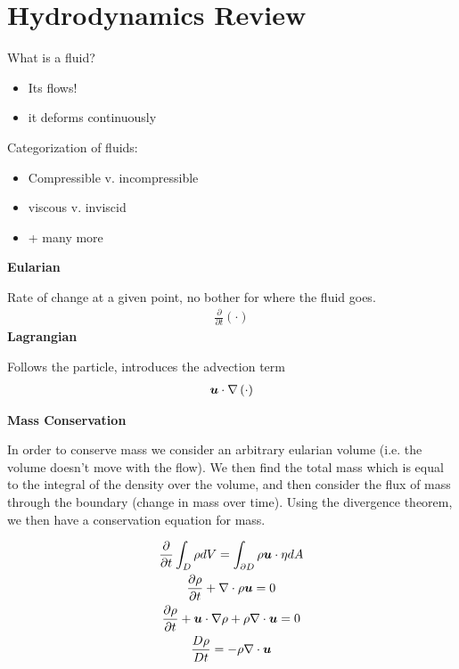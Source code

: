 \documentclass{article}
\begin{document}
\setlength{\parindent}{0pt}
\setcounter{section}{1}

\section{Hydrodynamics Review}

What is a fluid?
\begin{itemize}
    \item Its flows! 
    \item it deforms continuously
\end{itemize}

Categorization of fluids:
\begin{itemize}
    \item Compressible v. incompressible
    \item viscous v. inviscid
    \item + many more
\end{itemize}

\vspace{20pt}

    \centering
    {\Large \textbf{Eularian}}
    \vspace{5pt}

    Rate of change at a given point, no bother for where the fluid goes. 
    \begin{gather*}
        \frac{\partial}{\partial t}\left(\cdot\right) 
    \end{gather*}
\emp
\hspace{5pt}
    \centering
    {\Large \textbf{Lagrangian}}
    \vspace{5pt}

    Follows the particle, introduces the advection term
    \begin{gather*}
        \boldsymbol{u}\cdot\nabla \left(\cdot\right)
    \end{gather*}
\emp

\vspace{20pt}
{\Large \textbf{Mass Conservation}}
\vspace{5pt}


In order to conserve mass we consider an arbitrary eularian volume (i.e. the
volume doesn't move with the flow). We then find the total mass which is equal
to the integral of the density over the volume, and then consider the flux of
mass through the boundary (change in mass over time). Using the divergence
theorem, we then have a conservation equation for mass. 

\begin{gather*}
    \frac{\partial }{\partial t}\int_D\rho dV = \int_{\partial D} \rho\boldsymbol{u} \cdot \eta dA\\
    \frac{\partial \rho}{\partial t} + \nabla\cdot \rho\boldsymbol{u} = 0 \\
    \frac{\partial \rho}{\partial t} + \boldsymbol{u}\cdot\nabla\rho + \rho\nabla\cdot\boldsymbol{u} = 0\\
    \frac{D\rho}{Dt} = - \rho \nabla\cdot\boldsymbol{u}
\end{gather*}
\end{document}
